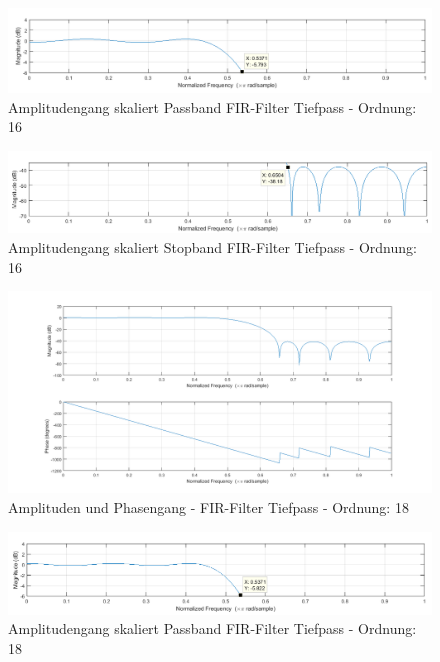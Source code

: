 \begin{figure}[H]
\centering
\includegraphics[width=1.0\linewidth]{Bilder/Attachment_A2_fir_2b_Amplitudengang_PassBand_17K}
\caption{Amplitudengang skaliert Passband FIR-Filter Tiefpass - Ordnung: 16}
\label{fig:Attachment_A2_fir_2b_Amplitudengang_PassBand_17K}
\end{figure}

\begin{figure}[H]
\centering
\includegraphics[width=1.0\linewidth]{Bilder/Attachment_A2_fir_2b_Amplitudengang_StopBand_17K}
\caption{Amplitudengang skaliert Stopband FIR-Filter Tiefpass - Ordnung: 16}
\label{fig:Attachment_A2_fir_2b_Amplitudengang_StopBand_17K}
\end{figure}

\newpage


\begin{figure}[H]
	\centering
	\includegraphics[width=1.0\linewidth]{./Bilder/Attachment_A2_fir_2b_Amplitudengang_19K}
	\caption{Amplituden und Phasengang - FIR-Filter Tiefpass - Ordnung: 18}
	\label{fig:Attachment_A2_fir_2b_Amplitudengang_19K}
\end{figure}


\begin{figure}[H]
	\centering
	\includegraphics[width=1.0\linewidth]{Bilder/Attachment_A2_fir_2b_Amplitudengang_PassBand_19K}
	\caption{Amplitudengang skaliert Passband FIR-Filter Tiefpass - Ordnung: 18}
	\label{fig:Attachment_A2_fir_2b_Amplitudengang_PassBand_19K}
\end{figure}

